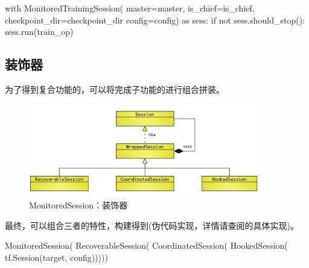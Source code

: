 \begin{content}
\begin{leftbar}
\begin{python}
with MonitoredTrainingSession(
  master=master,
  is_chief=is_chief,
  checkpoint_dir=checkpoint_dir
  config=config) as sess:
  if not sess.should_stop():
    sess.run(train_op)
\end{python}
\end{leftbar}

\subsection{装饰器}

为了得到复合功能的，可以将完成子功能的进行组合拼装。

\begin{enum}
\end{enum}

\begin{figure}[!htbp]
\centering
\includegraphics[width=0.9\textwidth]{figures/py-train-monitored-session-decorator.png}
\caption{MonitoredSession：装饰器}
 \label{fig:py-train-monitored-session-decorator}
\end{figure}

最终，可以组合三者的特性，构建得到(伪代码实现，详情请查阅的具体实现)。

\begin{leftbar}
\begin{python}
MonitoredSession(
  RecoverableSession(
    CoordinatedSession(
      HookedSession(
        tf.Session(target, config)))))
\end{python}
\end{leftbar}

\end{content}

